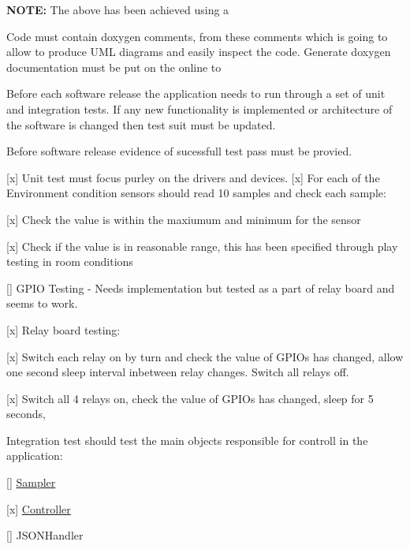 {\bfseries N\+O\+TE\+:} The above has been achieved using a

Code must contain doxygen comments, from these comments which is going to allow to produce U\+ML diagrams and easily inspect the code. Generate doxygen documentation must be put on the online to

Before each software release the application needs to run through a set of unit and integration tests. If any new functionality is implemented or architecture of the software is changed then test suit must be updated.

Before software release evidence of sucessfull test pass must be provied.

\mbox{[}x\mbox{]} Unit test must focus purley on the drivers and devices. \mbox{[}x\mbox{]} For each of the Environment condition sensors should read 10 samples and check each sample\+:
\begin{DoxyEnumerate}
\item \mbox{[}x\mbox{]} Check the value is within the maxiumum and minimum for the sensor
\item \mbox{[}x\mbox{]} Check if the value is in reasonable range, this has been specified through play testing in room conditions
\end{DoxyEnumerate}

\mbox{[}\mbox{]} G\+P\+IO Testing -\/ Needs implementation but tested as a part of relay board and seems to work.

\mbox{[}x\mbox{]} Relay board testing\+:
\begin{DoxyEnumerate}
\item \mbox{[}x\mbox{]} Switch each relay on by turn and check the value of G\+P\+I\+Os has changed, allow one second sleep interval inbetween relay changes. Switch all relays off.
\item \mbox{[}x\mbox{]} Switch all 4 relays on, check the value of G\+P\+I\+Os has changed, sleep for 5 seconds,
\end{DoxyEnumerate}

Integration test should test the main objects responsible for controll in the application\+:
\begin{DoxyItemize}
\item \mbox{[}\mbox{]} \hyperlink{classSampler}{Sampler}
\item \mbox{[}x\mbox{]} \hyperlink{classController}{Controller}
\item \mbox{[}\mbox{]} J\+S\+O\+N\+Handler
\end{DoxyItemize}

